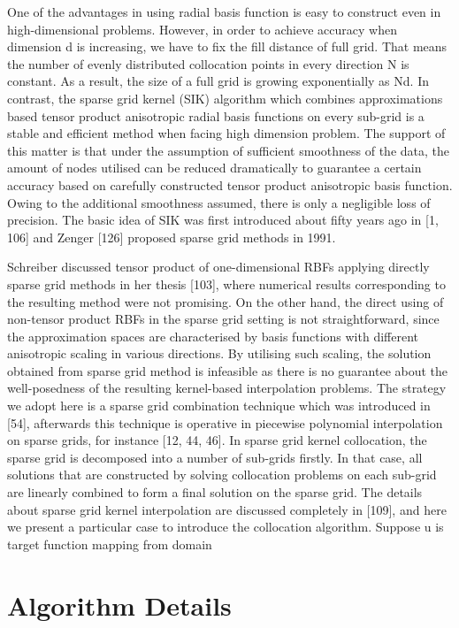 \documentclass[a4paper]{amsart}
\begin{document}
One of the advantages in using radial basis function is easy to construct even in
high-dimensional problems. However, in order to achieve accuracy when dimension
d is increasing, we have to fix the fill distance of full grid. That means the number
of evenly distributed collocation points in every direction N is constant. As a
result, the size of a full grid is growing exponentially as Nd. In contrast, the sparse
grid kernel (SIK) algorithm which combines approximations based tensor product
anisotropic radial basis functions on every sub-grid is a stable and efficient method
when facing high dimension problem. The support of this matter is that under
the assumption of sufficient smoothness of the data, the amount of nodes utilised
can be reduced dramatically to guarantee a certain accuracy based on carefully
constructed tensor product anisotropic basis function. Owing to the additional
smoothness assumed, there is only a negligible loss of precision. The basic idea of
SIK was first introduced about fifty years ago in [1, 106] and Zenger [126] proposed
sparse grid methods in 1991.

 Schreiber discussed tensor product of one-dimensional RBFs applying directly
sparse grid methods in her thesis [103], where numerical results corresponding to 
the resulting method were not promising. On the other hand, the direct using
of non-tensor product RBFs in the sparse grid setting is not straightforward,
since the approximation spaces are characterised by basis functions with different
anisotropic scaling in various directions. By utilising such scaling, the solution
obtained from sparse grid method is infeasible as there is no guarantee about the
well-posedness of the resulting kernel-based interpolation problems.
The strategy we adopt here is a sparse grid combination technique which was
introduced in [54], afterwards this technique is operative in piecewise polynomial
interpolation on sparse grids, for instance [12, 44, 46]. In sparse grid kernel
collocation, the sparse grid is decomposed into a number of sub-grids firstly. In
that case, all solutions that are constructed by solving collocation problems on each
sub-grid are linearly combined to form a final solution on the sparse grid. The
details about sparse grid kernel interpolation are discussed completely in [109],
and here we present a particular case to introduce the collocation algorithm.
Suppose u is target function mapping from domain 


\section{Algorithm Details}
\end{document}
